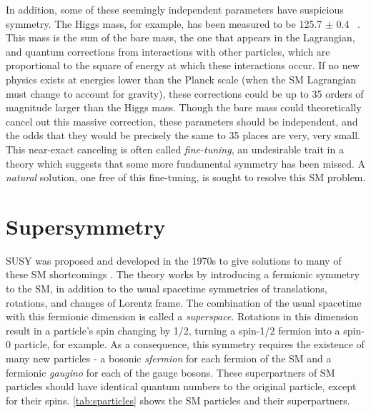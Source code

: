In addition, some of these seemingly independent parameters have suspicious symmetry. The Higgs mass, for example, has been measured to be 125.7 $\pm$ 0.4 \gev~\cite{Agashe:2014kda}. This mass is the sum of the bare mass, the one that appears in the Lagrangian, and quantum corrections from interactions with other particles, which are proportional to the square of energy at which these interactions occur. If no new physics exists at energies lower than the Planck scale (when the \ac{SM} Lagrangian must change to account for gravity), these corrections could be up to 35 orders of magnitude larger than the Higgs mass. Though the bare mass could theoretically cancel out this massive correction, these parameters should be independent, and the odds that they would be precisely the same to 35 places are very, very small. This near-exact canceling is often called \textit{fine-tuning}, an undesirable trait in a theory which suggests that some more fundamental symmetry has been missed. A \textit{natural} solution, one free of this fine-tuning, is sought to resolve this \ac{SM} problem. 


\section{Supersymmetry}

\acf{SUSY} was proposed and developed in the 1970s to give solutions to many of these \ac{SM} shortcomings \cite{WESS197439, 1971NuPhB..34..632G, 1971PhRvD...3.2415R}. The theory works by introducing a fermionic symmetry to the \ac{SM}, in addition to the usual spacetime symmetries of translations, rotations, and changes of Lorentz frame. The combination of the usual spacetime with this fermionic dimension is called a \textit{superspace}. Rotations in this dimension result in a particle's spin changing by 1/2, turning a spin-1/2 fermion into a spin-0 particle, for example. As a consequence, this symmetry requires the existence of many new particles - a bosonic \textit{sfermion} for each fermion of the \ac{SM} and a fermionic \textit{gaugino} for each of the gauge bosons. These superpartners of \ac{SM} particles should have identical quantum numbers to the original particle, except for their spins. \autoref{tab:sparticles} shows the \ac{SM} particles and their superpartners. 


